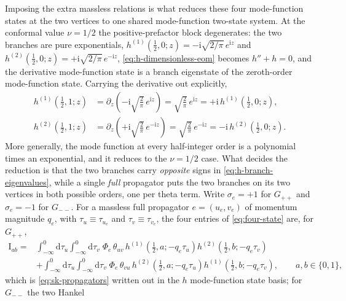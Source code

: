 \documentclass[11pt,a4paper]{article}
\newcommand{\dd}{\mathrm d}
\newcommand{\ii}{\mathrm i}
\begin{document}
Imposing the extra massless relations is what reduces these four mode-function states at the two vertices to one
shared mode-function two-state system.
At the conformal value $\nu=1/2$ the positive-prefactor block degenerates: the two branches are pure
exponentials, $h^{(1)}(\tfrac12,0;z)=-\ii\sqrt{2/\pi}\,e^{\ii z}$ and
$h^{(2)}(\tfrac12,0;z)=+\ii\sqrt{2/\pi}\,e^{-\ii z}$, \eqref{eq:h-dimensionless-eom} becomes
$h''+h=0$, and the derivative mode-function state is a branch eigenstate of the zeroth-order mode-function state. Carrying the
derivative out explicitly,
\begin{equation}
  \begin{aligned}
  h^{(1)}(\tfrac12,1;z)
  &=\partial_z\!\left(-\ii\sqrt{\tfrac2\pi}\,e^{\ii z}\right)
  =\sqrt{\tfrac2\pi}\,e^{\ii z}
  =+\ii\,h^{(1)}(\tfrac12,0;z),\\[2pt]
  h^{(2)}(\tfrac12,1;z)
  &=\partial_z\!\left(+\ii\sqrt{\tfrac2\pi}\,e^{-\ii z}\right)
  =\sqrt{\tfrac2\pi}\,e^{-\ii z}
  =-\ii\,h^{(2)}(\tfrac12,0;z).
  \end{aligned}
  \label{eq:h-branch-eigenvalues}
\end{equation}
More generally, the mode function at every half-integer order is a polynomial times an exponential,
and it reduces to the $\nu=1/2$ case. What decides the reduction is that the two branches carry \emph{opposite} signs in
\eqref{eq:h-branch-eigenvalues}, while a single \emph{full} propagator puts the two branches on its
two vertices in both possible orders, one per theta term. Write $\sigma_e=+1$ for $G_{++}$ and
$\sigma_e=-1$ for $G_{--}$. For a massless full propagator $e=(u_e,v_e)$ of momentum magnitude $q_e$,
with $\tau_u\equiv\tau_{u_e}$ and $\tau_v\equiv\tau_{v_e}$, the four entries of
\eqref{eq:four-state} are, for $G_{++}$,
\begin{equation}
  \begin{aligned}
  \text{I}_{ab}={}&\int_{-\infty}^{0}\!\!\dd\tau_u\!\int_{-\infty}^{0}\!\!\dd\tau_v\;\Phi_e\,
  \theta_{uv}\,h^{(1)}\!\left(\tfrac12,a;-q_e\tau_u\right)h^{(2)}\!\left(\tfrac12,b;-q_e\tau_v\right)\\
  &+\int_{-\infty}^{0}\!\!\dd\tau_u\!\int_{-\infty}^{0}\!\!\dd\tau_v\;\Phi_e\,
  \theta_{vu}\,h^{(2)}\!\left(\tfrac12,a;-q_e\tau_u\right)h^{(1)}\!\left(\tfrac12,b;-q_e\tau_v\right),
  \qquad a,b\in\{0,1\},
  \end{aligned}
  \label{eq:massless-four-states}
\end{equation}
which is \eqref{eq:sk-propagators} written out in the $h$ mode-function state basis; for $G_{--}$ the two Hankel
\end{document}
